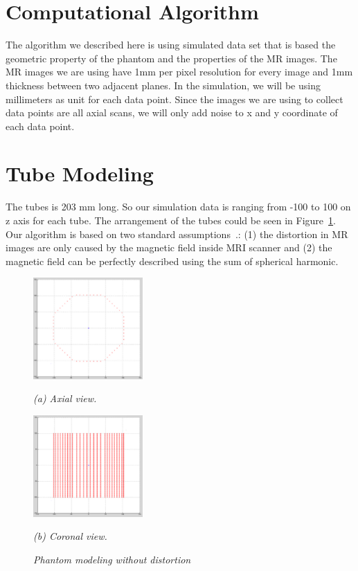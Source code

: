 \section{Computational Algorithm}

The algorithm we described here is using simulated data set that is based the
geometric property of the phantom and the properties of the MR images.
The MR images we are using have 1mm per pixel resolution for every image and
1mm thickness between two adjacent planes. In the simulation, we will be using millimeters as unit for
each data point. Since the images we are using to collect data points are all axial scans,
we will only add noise to x and y coordinate of each data point.

\section{Tube Modeling}

The tubes is 203 mm long. So our simulation data is ranging from -100 to 100 on z axis for each tube.
The arrangement of the tubes could be seen in Figure~\ref{fig:1}.
Our algorithm is based on two standard assumptions~\cite{LSS06a,LSS06b,LSS08a,LSS08b,Lang99}.: (1) the distortion in MR images are only caused by the magnetic field inside MRI scanner and (2) the magnetic field can be perfectly described using the sum of spherical harmonic.

\begin{figure}[htb]

  \begin{minipage}[b]{1.65in}
    \centering
    \centerline{\mbox{\includegraphics[width=1.65in]{isocenter/images/simulation/axial_no_distortion.eps}}}
    \centerline{\emph{(a) Axial view.}}\medskip
  \end{minipage}
  \hfill
  \begin{minipage}[b]{1.65in}
    \centering
    \centerline{\mbox{\includegraphics[width=1.65in]{isocenter/images/simulation/coronal_no_distortion.eps}}}
    \centerline{\emph{(b) Coronal view.}}\medskip
  \end{minipage}
%
\caption{\emph{Phantom modeling without distortion}} \label{fig:1}
%
\end{figure}

